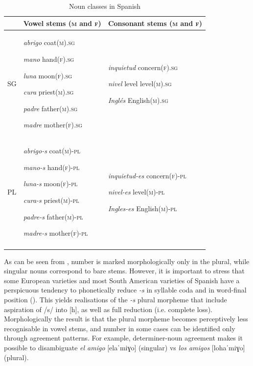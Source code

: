 \documentclass[output=paper]{langscibook}
\begin{document}
\begin{table}
\begin{tabularx}{\textwidth}{lQQ}
\lsptoprule
 & Vowel stems (\textsc{m} and \textsc{f}) & Consonant stems (\textsc{m} and \textsc{f})\\
\midrule
SG & \textit{abrigo} coat(\textsc{m).sg}

\textit{mano} hand(\textsc{f).sg}

\textit{luna} moon(\textsc{f).sg}

\textit{cura} priest(\textsc{m).sg}

\textit{padre} father(\textsc{m).sg}

\textit{madre} mother(\textsc{f).sg} & \textit{inquietud} concern(\textsc{f).sg}

\textit{nivel} level level(\textsc{m).sg}

\textit{Inglés} English(\textsc{m).sg}\\
\tablevspace
PL & \textit{abrigo-s} coat(\textsc{m)-pl}

\textit{mano-s} hand(\textsc{f)-pl}

\textit{luna-s} moon(\textsc{f)-pl}

\textit{cura-s} priest(\textsc{m)-pl}

\textit{padre-s} father(\textsc{m)-pl}

\textit{madre-s} mother(\textsc{f)-pl} & \textit{inquietud-es} concern(\textsc{f)-pl}

\textit{nivel-es} level(\textsc{m)-pl}

\textit{Ingles-es} English(\textsc{m)-pl}\\
\lspbottomrule
\end{tabularx}
\caption{Noun classes in Spanish}
\label{tab:goria:2}
\end{table}

As can be seen from , number is marked morphologically only in the plural, while singular nouns correspond to bare stems. However, it is important to stress that some European varieties and most South American varieties of Spanish have a perspicuous tendency to phonetically reduce \textit{{}-s} in syllable coda and in word-final position (\citealt{Terrell1978,Lipski1986,BrownTorresCacoullos2002}). This yields realisations of the \textit{{}-s} plural morpheme that include aspiration of /s/ into [h], as well as full reduction (i.e. complete loss). Morphologically the result is that the plural morpheme becomes perceptively less recognisable in vowel stems, and number in some cases can be identified only through agreement patterns. For example, determiner-noun agreement makes it possible to disambiguate \textit{el amigo} [elaˈmiɣo] (singular) vs \textit{los amigos} [lohaˈmiɣo] (plural).
\end{document}
